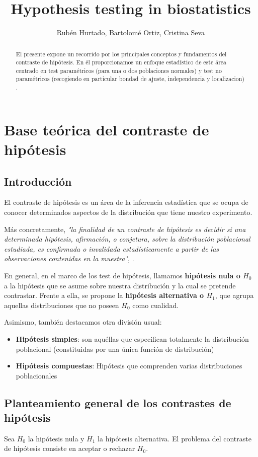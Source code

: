 \documentclass[a4paper,12pt]{article}
\title{Hypothesis testing in biostatistics}
\author{Rubén Hurtado, Bartolomé Ortiz, Cristina Seva }
\begin{document}
\maketitle

\begin{abstract}
El presente expone un recorrido por los principales conceptos y fundamentos del contraste de hipótesis. En él proporcionamos un enfoque estadístico de este área centrado en test paramétricos (para una o dos poblaciones normales) y test no paramétricos (recogiendo en particular bondad de ajuste, independencia y localizacion) . 
\end{abstract}


\section{Base teórica del contraste de hipótesis}
\subsection{Introducción}
El contraste de hipótesis es un área de la inferencia estadística que se ocupa de conocer determinados aspectos de la distribución que tiene nuestro experimento.

Más concretamente, \textit{"la finalidad de un contraste de hipótesis es decidir si una determinada hipótesis, afirmación, o conjetura, sobre la distribución poblacional estudiada, es confirmada o invalidada estadísticamente a partir de las observaciones contenidas en la muestra"}, \cite{velez1993principios}.

En general, en el marco de los test de hipótesis, llamamos \textbf{hipótesis nula o $H_0$} a la hipótesis que se asume sobre nuestra distribución y la cual se pretende contrastar.
Frente a ella, se propone la \textbf{hipótesis alternativa o $H_1$}, que agrupa aquellas distribuciones que no poseen $H_0$ como cualidad.

Asimismo, también destacamos otra división usual:
\begin{itemize}
	\item \textbf{Hipótesis simples}: son aquéllas que especifican totalmente la distribución poblacional (constituidas por una única función de distribución)
	\item \textbf{Hipótesis compuestas}: Hipótesis  que comprenden varias distribuciones poblacionales 
\end{itemize}

\subsection{Planteamiento general de los contrastes de hipótesis}
Sea $H_0$ la hipótesis nula y $H_1$ la hipótesis alternativa. El problema del contraste de hipótesis consiste en aceptar o rechazar $H_0$.
\end{document}

